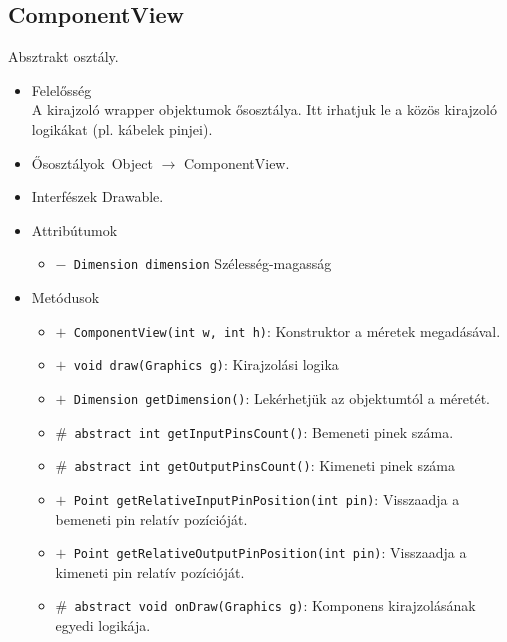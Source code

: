 \subsection{ComponentView}
Absztrakt osztály.
\begin{itemize}
\item Felelősség\\
A kirajzoló wrapper objektumok ősosztálya. Itt irhatjuk le a közös kirajzoló logikákat (pl. kábelek pinjei).
\item Ősosztályok\ Object $\rightarrow{}$ ComponentView.
\item Interfészek Drawable.
\item Attribútumok $\ $
\begin{itemize}
	\item[] \texttt{$-$ Dimension dimension} Szélesség-magasság
\end{itemize}
\item Metódusok$\ $
\begin{itemize}
	\item[] \texttt{$+$ ComponentView(int w, int h)}: Konstruktor a méretek megadásával.
	\item[] \texttt{$+$ void draw(Graphics g)}: Kirajzolási logika
	\item[] \texttt{$+$ Dimension getDimension()}: Lekérhetjük az objektumtól a méretét.
	\item[] \texttt{$\#$ abstract int getInputPinsCount()}: Bemeneti pinek száma.
	\item[] \texttt{$\#$ abstract int getOutputPinsCount()}: Kimeneti pinek száma
	\item[] \texttt{$+$ Point getRelativeInputPinPosition(int pin)}: 
Visszaadja a bemeneti pin relatív pozícióját.
	\item[] \texttt{$+$ Point getRelativeOutputPinPosition(int pin)}: 
Visszaadja a kimeneti pin relatív pozícióját.
	\item[] \texttt{$\#$ abstract void onDraw(Graphics g)}: Komponens kirajzolásának egyedi logikája.
\end{itemize}
\end{itemize}

